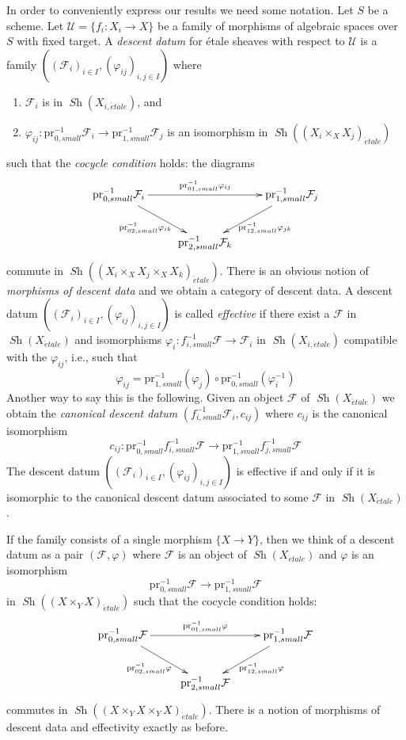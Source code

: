 \documentclass{stacks-project}
\theoremstyle{plain}
\theoremstyle{definition}
\theoremstyle{remark}
\numberwithin{equation}{subsection}
\def\Sh{\mathop{\mathit{Sh}}\nolimits}
\def\etale{{\acute{e}tale}}
\begin{document}
\medskip\noindent
In order to conveniently express our results we need some notation.
Let $S$ be a scheme.
Let $\mathcal{U} = \{f_i : X_i \to X\}$
be a family of morphisms of algebraic spaces over $S$ with fixed target.
A {\it descent datum} for \'etale sheaves with respect to
$\mathcal{U}$ is a family
$((\mathcal{F}_i)_{i \in I}, (\varphi_{ij})_{i, j \in I})$ where
\begin{enumerate}
\item $\mathcal{F}_i$ is in $\Sh(X_{i, \etale})$, and
\item $\varphi_{ij} :
\text{pr}_{0, small}^{-1} \mathcal{F}_i
\longrightarrow
\text{pr}_{1, small}^{-1} \mathcal{F}_j$
is an isomorphism in $\Sh((X_i \times_X X_j)_\etale)$
\end{enumerate}
such that the {\it cocycle condition} holds: the diagrams
$$
\xymatrix{
\text{pr}_{0, small}^{-1}\mathcal{F}_i
\ar[dr]_{\text{pr}_{02, small}^{-1}\varphi_{ik}}
\ar[rr]^{\text{pr}_{01, small}^{-1}\varphi_{ij}} & &
\text{pr}_{1, small}^{-1}\mathcal{F}_j
\ar[dl]^{\text{pr}_{12, small}^{-1}\varphi_{jk}} \\
& \text{pr}_{2, small}^{-1}\mathcal{F}_k
}
$$
commute in $\Sh((X_i \times_X X_j \times_X X_k)_\etale)$.
There is an obvious notion of {\it morphisms of descent data}
and we obtain a category of descent data.
A descent datum
$((\mathcal{F}_i)_{i \in I}, (\varphi_{ij})_{i, j \in I})$
is called {\it effective} if there exist a
$\mathcal{F}$ in $\Sh(X_\etale)$ and isomorphisms
$\varphi_i : f_{i, small}^{-1} \mathcal{F} \to \mathcal{F}_i$
in $\Sh(X_{i, \etale})$ compatible with the $\varphi_{ij}$, i.e.,
such that
$$
\varphi_{ij} =
\text{pr}_{1, small}^{-1} (\varphi_j) \circ
\text{pr}_{0, small}^{-1} (\varphi_i^{-1})
$$
Another way to say this is the following. Given an object $\mathcal{F}$
of $\Sh(X_\etale)$ we obtain the {\it canonical descent datum}
$(f_{i, small}^{-1}\mathcal{F}_i, c_{ij})$ where $c_{ij}$
is the canonical isomorphism
$$
c_{ij} : \text{pr}_{0, small}^{-1} f_{i, small}^{-1}\mathcal{F}
\longrightarrow
\text{pr}_{1, small}^{-1} f_{j, small}^{-1}\mathcal{F}
$$
The descent datum
$((\mathcal{F}_i)_{i \in I}, (\varphi_{ij})_{i, j \in I})$
is effective if and only if it is isomorphic to the canonical
descent datum associated to some $\mathcal{F}$ in $\Sh(X_\etale)$.

\medskip\noindent
If the family consists of a single morphism $\{X \to Y\}$,
then we think of a descent datum as a pair $(\mathcal{F}, \varphi)$
where $\mathcal{F}$ is an object of $\Sh(X_\etale)$ and
$\varphi$ is an isomorphism
$$
\text{pr}_{0, small}^{-1} \mathcal{F}
\longrightarrow
\text{pr}_{1, small}^{-1} \mathcal{F}
$$
in $\Sh((X \times_Y X)_\etale)$ such that the cocycle condition holds:
$$
\xymatrix{
\text{pr}_{0, small}^{-1}\mathcal{F}
\ar[dr]_{\text{pr}_{02, small}^{-1}\varphi}
\ar[rr]^{\text{pr}_{01, small}^{-1}\varphi} & &
\text{pr}_{1, small}^{-1}\mathcal{F}
\ar[dl]^{\text{pr}_{12, small}^{-1}\varphi} \\
& \text{pr}_{2, small}^{-1}\mathcal{F}
}
$$
commutes in $\Sh((X \times_Y X \times_Y X)_\etale)$.
There is a notion of morphisms of descent data and effectivity
exactly as before.
\end{document}
